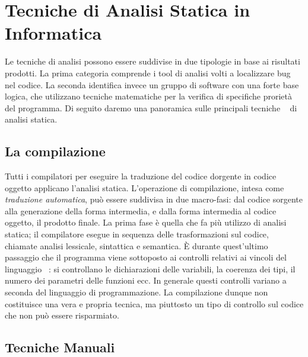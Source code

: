 \section{Tecniche di Analisi Statica in Informatica}

Le tecniche di analisi possono essere suddivise in due tipologie in base ai risultati prodotti. La prima categoria comprende i tool di analisi volti a localizzare bug nel codice. La seconda identifica invece un gruppo di software con una forte base logica, che utilizzano tecniche matematiche per la verifica di specifiche prorietà del programma.\newline
\indent Di seguito daremo una panoramica sulle principali tecniche ~\cite{analisi-statica-unina} di analisi statica.

    \subsection{La compilazione}
    

    Tutti i compilatori per eseguire la traduzione del codice dorgente in codice oggetto applicano l'analisi statica. L'operazione di compilazione, intesa come \emph{traduzione automatica}, può essere suddivisa in due macro-fasi: dal codice sorgente alla generazione della forma intermedia, e dalla forma intermedia al codice oggetto, il prodotto finale. La prima fase è quella che fa più utilizzo di analisi statica; il compilatore esegue in sequenza delle trasformazioni sul codice, chiamate analisi lessicale, sintattica e semantica. \`E durante quest'ultimo passaggio che il programma viene sottoposto ai controlli relativi ai vincoli del linguaggio ~\cite{gabbrielli2011linguaggi}: si controllano le dichiarazioni delle variabili, la coerenza dei tipi, il numero dei parametri delle funzioni ecc. 
    In generale questi controlli variano a seconda del linguaggio di programmazione.\newline
    La compilazione dunque non costituisce una vera e propria tecnica, ma piuttosto un tipo di controllo sul codice che non può essere risparmiato.\newline
    
    \subsection{Tecniche Manuali}
    
